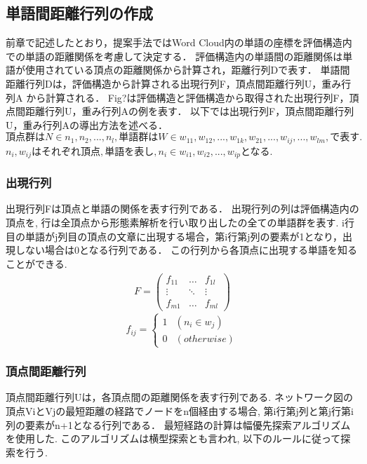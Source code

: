 \documentclass[syuuron]{kuee}
\begin{document}
		\subsection{単語間距離行列の作成}
			前章で記述したとおり，提案手法ではWord Cloud内の単語の座標を評価構造内での単語の距離関係を考慮して決定する．
			評価構造内の単語間の距離関係は単語が使用されている頂点の距離関係から計算され，距離行列Dで表す．
			単語間距離行列Dは，評価構造から計算される出現行列F，頂点間距離行列U，重み行列A から計算される．
			Fig?は評価構造と評価構造から取得された出現行列F，頂点間距離行列U，重み行列Aの例を表す．
			以下では出現行列F，頂点間距離行列U，重み行列Aの導出方法を述べる．
			$頂点群はN \in {n_{1}, n_{2}, ..., n_{l}}, 単語群はW \in {w_{11}, w_{12}, ..., w_{1k}, w_{21},..., w_{ij},..., w_{lm}}, で表す. $
			$n_i,w_{ij}はそれぞれ頂点, 単語を表し, n_i \in {w_{i1}, w_{i2}, ..., w_{ip}}$となる. 
		
			\subsubsection{出現行列}
				出現行列Fは頂点と単語の関係を表す行列である．
				出現行列の列は評価構造内の頂点を, 行は全頂点から形態素解析を行い取り出したの全ての単語群を表す. 
				i行目の単語がj列目の頂点の文章に出現する場合，第i行第j列の要素が1となり，出現しない場合は0となる行列である．
				この行列から各頂点に出現する単語を知ることができる. 
				\begin{eqnarray}
				 F = \left(
				    \begin{array}{cccc}
				    	f_{11} & \ldots & f_{1l} \\
				    	\vdots & \ddots & \vdots \\
				    	f_{m1} & \ldots & f_{ml}
					\end{array}
				 \right)
				\end{eqnarray}	
				\[
				  f_{ij} = \left\{ \begin{array}{ll}
				    1 & (n_i \in w_j) \\
				    0 & (otherwise)
				  \end{array} \right.
				\]
				
			\subsubsection{頂点間距離行列}
				頂点間距離行列Uは，各頂点間の距離関係を表す行列である. 
				ネットワーク図の頂点ViとVjの最短距離の経路でノードをn個経由する場合, 
				第i行第j列と第j行第i列の要素がn+1となる行列である．
				最短経路の計算は幅優先探索アルゴリズムを使用した. 
				このアルゴリズムは横型探索とも言われ, 以下のルールに従って探索を行う. 
				
\end{document}
